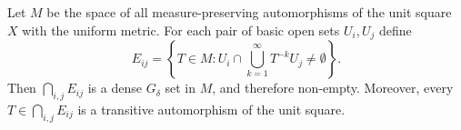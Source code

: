 Let $M$ be the space of all measure-preserving automorphisms of the unit square $X$ with the uniform metric. For each pair of basic open sets $U_i, U_j$ define
$$E_{ij} = \left\{ T \in M : U_i \cap \bigcup_{k=1}^{\infty} T^{-k} U_j \neq \emptyset \right\}.$$
Then $\bigcap_{i,j} E_{ij}$ is a dense $G_{\delta}$ set in $M$, and therefore non-empty. Moreover, every $T \in \bigcap_{i,j} E_{ij}$ is a transitive automorphism of the unit square.
